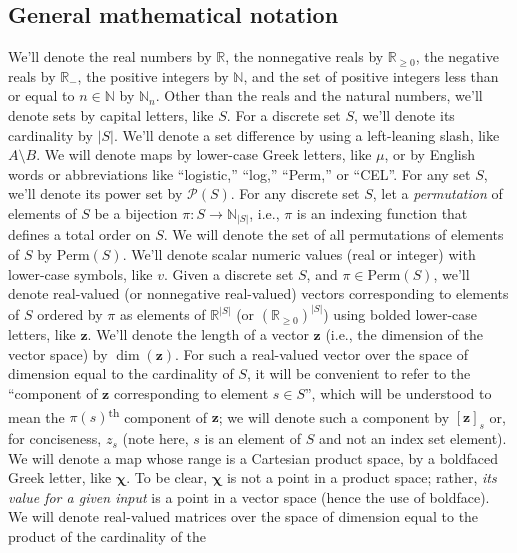 \documentclass[11pt,notitlepage,english]{article}
\begin{document}
\subsection{General mathematical notation}\label{sec:math}
We'll denote the real numbers by ${\mathbb R}$, the nonnegative reals by
${\mathbb R}_{\geq 0}$, the negative reals by ${\mathbb R}_{-}$, the positive
integers by ${\mathbb N}$, and the set of positive integers less than or equal
to $n \in {\mathbb N}$ by ${\mathbb N}_n$.  Other than the reals and the natural
numbers, we'll denote sets by capital letters, like $S$.  For a discrete set
$S$, we'll denote its cardinality by $|S|$.  We'll denote a set difference by
using a left-leaning slash, like $A \setminus B$. We will denote maps by
lower-case Greek letters, like $\mu$, or by English words or abbreviations like
``logistic,'' ``log,'' ``Perm,'' or ``CEL''\@.  For any set $S$, we'll denote
its power set by ${\mathcal P}(S)$.  For any discrete set $S$, let a {\em
  permutation\/} of elements of $S$ be a bijection $\pi: S \rightarrow {\mathbb
  N}_{|S|}$, i.e., $\pi$ is an indexing function that defines a total order on
$S$.  We will denote the set of all permutations of elements of $S$ by
$\textrm{Perm}(S)$.  We'll denote scalar numeric values (real or integer) with
lower-case symbols, like $v$. Given a discrete set $S$, and $\pi \in
\textrm{Perm}(S)$, we'll denote real-valued (or nonnegative real-valued) vectors
corresponding to elements of $S$ ordered by $\pi$ as elements of ${\mathbb
  R}^{|S|}$ (or ${({\mathbb R}_{\geq 0})}^{|S|}$) using bolded lower-case
letters, like ${\boldsymbol z}$. We'll denote the length of a vector
$\boldsymbol{z}$ (i.e., the dimension of the vector space) by $\dim({\boldsymbol
  z})$.  For such a real-valued vector over the space of dimension equal to the
cardinality of $S$, it will be convenient to refer to the ``component of
$\boldsymbol{z}$ corresponding to element $s \in S$'', which will be understood
to mean the $\pi(s)$\textsuperscript{th} component of $\boldsymbol{z}$; we will
denote such a component by $[\boldsymbol{z}]_s$ or, for conciseness, $z_s$ (note
here, $s$ is an element of $S$ and not an index set element). We will denote a
map whose range is a Cartesian product space, by a boldfaced Greek letter, like
$\boldsymbol{\chi}$. To be clear, $\boldsymbol{\chi}$ is not a point in a
product space; rather, {\em its value for a given input\/} is a point in a
vector space (hence the use of boldface). We will denote real-valued matrices
over the space of dimension equal to the product of the cardinality of the
\end{document}
